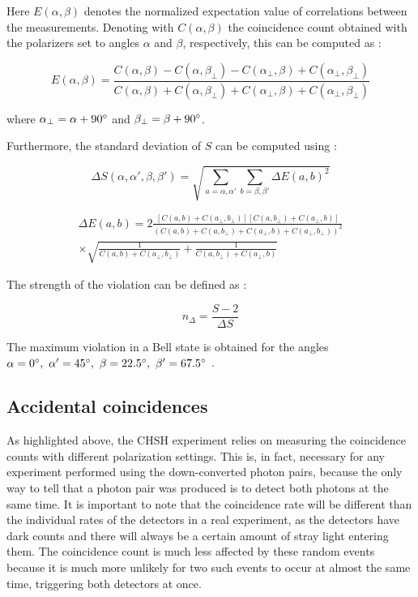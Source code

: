 \documentclass[a4paper,
DIV=13,
12pt,
BCOR=10mm,
department=FakEI,
twoside,
parskip=half,
automark,
logostyle=flat,
]{OTHRartcl}
\begin{document}
Here $E(\alpha, \beta)$ denotes the normalized expectation value of correlations between the measurements. Denoting with $C(\alpha, \beta)$ the coincidence count obtained with the polarizers set to angles $\alpha$ and $\beta$, respectively, this can be computed as \cite{qued_manual}:

\begin{equation}
    E(\alpha, \beta) = \frac{C(\alpha, \beta) - C(\alpha, \beta_\perp) - C(\alpha_\perp, \beta) + C(\alpha_\perp, \beta_\perp)}{C(\alpha, \beta) + C(\alpha, \beta_\perp) + C(\alpha_\perp, \beta) + C(\alpha_\perp, \beta_\perp)}
    \label{CHSH_correlation}
\end{equation}

where $\alpha_\perp = \alpha + 90\degree$ and $\beta_\perp = \beta + 90\degree$.

Furthermore, the standard deviation of $S$ can be computed using \cite{qued_manual}:

\begin{equation}
    \Delta S(\alpha, \alpha', \beta, \beta') = \sqrt{\sum_{a=\alpha,\alpha'} \sum_{b=\beta,\beta'} \Delta E(a,b)^2}
    \label{CHSH_std_deviation}
\end{equation}

\begin{multline}
    \Delta E(a,b) = 2 \frac{\left[ C(a,b) + C(a_\perp, b_\perp) \right] \left[ C(a, b_\perp) + C(a_\perp, b) \right]}{\left( C(a,b) + C(a, b_\perp) + C(a_\perp, b) + C(a_\perp, b_\perp) \right)^2} \\
    \times \sqrt{\frac{1}{C(a,b) + C(a_\perp, b_\perp)} + \frac{1}{C(a, b_\perp) + C(a_\perp, b)}}
    \label{CHSH_correlation_std_deviation}
\end{multline}

The strength of the violation can be defined as \cite{qued_manual}:

\begin{equation}
    n_{\Delta} = \frac{S - 2}{\Delta S}
    \label{CHSH_strength}
\end{equation}

The maximum violation in a Bell state is obtained for the angles $\alpha = 0\degree,\ \alpha' = 45\degree,\ \beta = 22.5\degree,\ \beta' = 67.5\degree$ \cite{qued_manual}.


\subsection{Accidental coincidences}

As highlighted above, the CHSH experiment relies on measuring the coincidence counts with different polarization settings. This is, in fact, necessary for any experiment performed using the down-converted photon pairs, because the only way to tell that a photon pair was produced is to detect both  photons at the same time. It is important to note that the coincidence rate will be different than the individual rates of the detectors in a real experiment, as the detectors have dark counts and there will always be a certain amount of stray light entering them. The coincidence count is much less affected by these random events because it is much more unlikely for two such events to occur at almost the same time, triggering both detectors at once.
\end{document}
